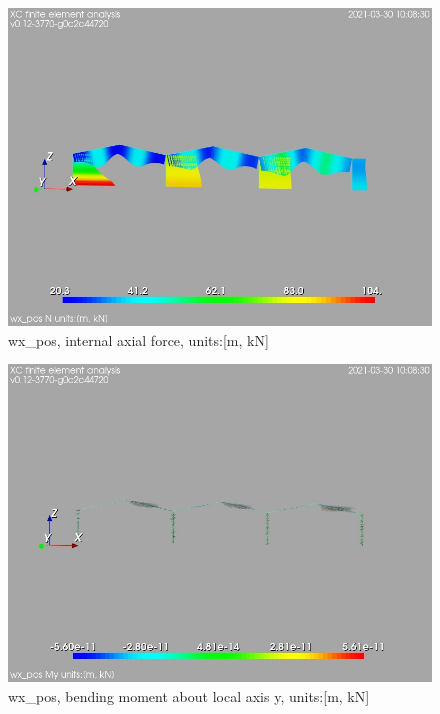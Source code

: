 \begin{figure}
\begin{center}
\includegraphics[width=\linewidth]{calc_results/sole_zeinali/text/graphics/resSimplLC/wx_posallMemberSetN}
\caption{wx_pos, internal axial force, units:[m, kN]}
\end{center}
\end{figure}
\begin{figure}
\begin{center}
\includegraphics[width=\linewidth]{calc_results/sole_zeinali/text/graphics/resSimplLC/wx_posallMemberSetMy}
\caption{wx_pos, bending moment about local axis y, units:[m, kN]}
\end{center}
\end{figure}
